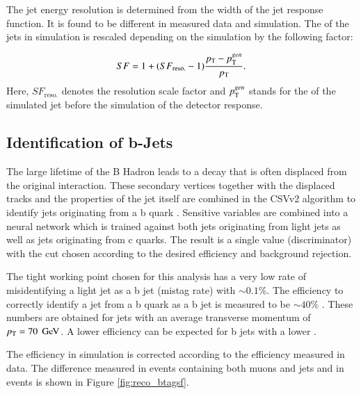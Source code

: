 The jet energy resolution is determined from the width of the jet response function. It is found to be different in measured data and simulation. The \pt of the jets in simulation is rescaled depending on the simulation by the following
factor:

\begin{equation}
SF = 1 + (SF_{\mathrm{reso.}}-1) \frac{p_{\mathrm{T}} - p_{\mathrm{T}}^{gen}}{p_{\mathrm{T}}}.
\end{equation}
Here, $SF_{\mathrm{reso.}}$ denotes the resolution scale factor and $p_{\mathrm{T}}^{gen}$ stands for the \pt of the simulated jet before the simulation of the detector response. 

\subsection{Identification of b-Jets}

The large lifetime of the B Hadron leads to a decay that is often displaced from the original interaction.
These secondary vertices together with the displaced tracks and the properties of the jet itself are combined in the CSVv2 algorithm to identify jets originating from a b quark \cite{BTV16002}.
Sensitive variables are combined into a neural network which is trained against both jets originating from light jets as well as jets originating from c quarks.
The result is a single value (discriminator) with the cut chosen according to the desired efficiency and background rejection.

The tight working point chosen for this analysis has a very low rate of misidentifying a light jet as a b jet (mistag rate) with $\sim 0.1\%$. The efficiency to correctly identify a jet from a b quark
as a b jet is measured to be $\sim 40 \%$ \cite{BTV16002}. These numbers are obtained for jets with an average transverse momentum of $p_{\mathrm{T}} = 70\;\,\text{Ge\hspace{-.08em}V}$. A lower efficiency can be expected for b jets with a lower \pt.

The efficiency in simulation is corrected according to the efficiency measured in data. The difference measured in events containing both muons and jets and in \ttbar events is shown in Figure \ref{fig:reco_btagsf}.

